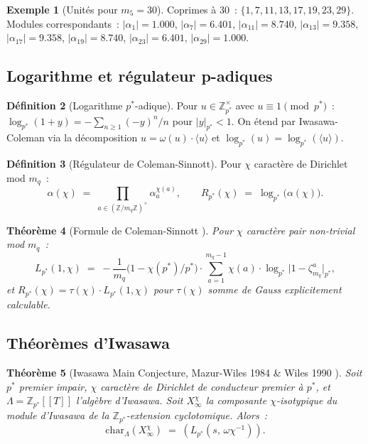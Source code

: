 \documentclass[11pt,a4paper]{article}
\newtheorem{theorem}{Théorème}[section]
\theoremstyle{definition}
\newtheorem{definition}[theorem]{Définition}
\newtheorem{example}[theorem]{Exemple}
\newcommand{\Z}{\mathbb{Z}}
\begin{document}
\begin{example}[Unités pour $m_5 = 30$]
Coprimes à $30$~: $\{1,7,11,13,17,19,23,29\}$. Modules
correspondants~:
$|\alpha_1|=1.000$, $|\alpha_7|=6.401$, $|\alpha_{11}|=8.740$,
$|\alpha_{13}|=9.358$, $|\alpha_{17}|=9.358$, $|\alpha_{19}|=8.740$,
$|\alpha_{23}|=6.401$, $|\alpha_{29}|=1.000$.
\end{example}

\subsection{Logarithme et régulateur p-adiques}

\begin{definition}[Logarithme $p^*$-adique]
\label{def:log_padic}
Pour $u\in\Z_{p^*}^\times$ avec $u\equiv 1\pmod{p^*}$~:
$\log_{p^*}(1+y) = -\sum_{n\geq 1}(-y)^n/n$ pour $|y|_{p^*} < 1$.
On étend par Iwasawa-Coleman via la décomposition
$u = \omega(u)\cdot\langle u\rangle$ et
$\log_{p^*}(u) = \log_{p^*}(\langle u\rangle)$.
\end{definition}

\begin{definition}[Régulateur de Coleman-Sinnott]
\label{def:reg_cs}
Pour $\chi$ caractère de Dirichlet mod $m_q$~:
\begin{equation}
  \alpha(\chi) \;=\; \prod_{a\in (\Z/m_q\Z)^\times}\alpha_a^{\chi(a)},
  \qquad
  R_{p^*}(\chi) \;=\; \log_{p^*}\!\bigl(\alpha(\chi)\bigr).
\end{equation}
\end{definition}

\begin{theorem}[Formule de Coleman-Sinnott {\upshape [PROUVÉ]}]
\label{thm:coleman_sinnott}
Pour $\chi$ caractère pair non-trivial mod $m_q$~:
\begin{equation}
  L_{p^*}(1,\chi) \;=\;
  -\frac{1}{m_q}\bigl(1-\chi(p^*)/p^*\bigr) \cdot
  \sum_{a=1}^{m_q-1} \chi(a)\cdot \log_{p^*}\!\bigl|1-\zeta_{m_q}^a\bigr|_{p^*},
\end{equation}
et $R_{p^*}(\chi) = \tau(\chi)\cdot L_{p^*}(1,\chi)$ pour $\tau(\chi)$
somme de Gauss explicitement calculable.
\end{theorem}

\subsection{Théorèmes d'Iwasawa}

\begin{theorem}[Iwasawa Main Conjecture, Mazur-Wiles 1984 \& Wiles 1990 {\upshape [PROUVÉ]}]
\label{thm:iwasawa_mc}
Soit $p^*$ premier impair, $\chi$ caractère de Dirichlet de
conducteur premier à $p^*$, et $\Lambda = \Z_{p^*}[[T]]$ l'algèbre
d'Iwasawa. Soit $X_\infty^\chi$ la composante $\chi$-isotypique
du module d'Iwasawa de la $\Z_{p^*}$-extension cyclotomique. Alors~:
\begin{equation}
  \mathrm{char}_\Lambda(X_\infty^\chi) \;=\;
  (L_{p^*}(s,\,\omega\chi^{-1})).
\end{equation}
\end{theorem}
\end{document}
